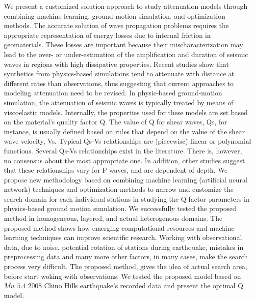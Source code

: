 %
We present a customized solution approach to study attenuation models through combining machine learning, ground motion simulation, and optimization methods. The accurate solution of wave propagation problems requires the appropriate representation of energy losses due to internal friction in geomaterials. These losses are important because their mischaracterization may lead to the over- or under-estimation of the amplification and duration of seismic waves in regions with high dissipative properties. Recent studies show that synthetics from physics-based simulations tend to attenuate with distance at different rates than observations, thus suggesting that current approaches to modeling attenuation need to be revised. In physic-based ground-motion simulation, the attenuation of seismic waves is typically treated by means of viscoelastic models. Internally, the properties used for these models are set based on the material's quality factor Q. The value of Q for shear waves, Qs, for instance, is usually defined based on rules that depend on the value of the shear wave velocity, Vs.  Typical Qs-Vs relationships are (piecewise) linear or polynomial functions. Several Qs-Vs relationships exist in the literature. There is, however, no consensus about the most appropriate one. In addition, other studies suggest that these relationships vary for P waves, and are dependent of depth. 
We propose new methodology based on  combining machine learning (artificial neural network) techniques and optimization methods to narrow and customize the search domain for each individual stations in studying the Q factor parameters in physics-based ground motion simulation. We successfully tested the proposed method in homogeneous, layered, and actual heterogenous domains. The proposed method shows how emerging computational resources and machine learning techniques can improve scientific research. Working with observational data, due to noise, potential rotation of stations during earthquake, mistakes in preprocessing data and many more other factors, in many cases, make the search process very difficult. The proposed method, gives the idea of actual search area, before start woking with observations. We tested the proposed model based on $Mw ~5.4$ 2008 Chino Hills earthquake's recorded data and present the optimal Q model. 



